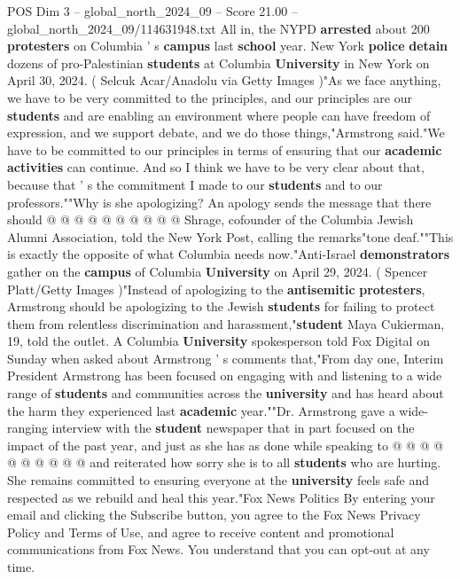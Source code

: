 \begin{textsample}{POS Dim 3 – global\_north\_2024\_09 – Score 21.00 – global\_north\_2024\_09/114631948.txt}
All in, the NYPD \textbf{arrested} about 200 \textbf{protesters} on Columbia ' s \textbf{campus} last \textbf{school} year.
New York \textbf{police} \textbf{detain} dozens of pro-Palestinian \textbf{students} at Columbia \textbf{University} in New York on April 30, 2024. ( Selcuk Acar/Anadolu via Getty Images )"As we face anything, we have to be very committed to the principles, and our principles are our \textbf{students} and are enabling an environment where people can have freedom of expression, and we support debate, and we do those things,"Armstrong said."We have to be committed to our principles in terms of ensuring that our \textbf{academic} \textbf{activities} can continue.
And so I think we have to be very clear about that, because that ' s the commitment I made to our \textbf{students} and to our professors.""Why is she apologizing?
An apology sends the message that there should @ @ @ @ @ @ @ @ @ @ Shrage, cofounder of the Columbia Jewish Alumni Association, told the New York Post, calling the remarks"tone deaf.""This is exactly the opposite of what Columbia needs now."Anti-Israel \textbf{demonstrators} gather on the \textbf{campus} of Columbia \textbf{University} on April 29, 2024. ( Spencer Platt/Getty Images )"Instead of apologizing to the \textbf{antisemitic} \textbf{protesters}, Armstrong should be apologizing to the Jewish \textbf{students} for failing to protect them from relentless discrimination and harassment,"\textbf{student} Maya Cukierman, 19, told the outlet.
A Columbia \textbf{University} spokesperson told Fox Digital on Sunday when asked about Armstrong ' s comments that,"From day one, Interim President Armstrong has been focused on engaging with and listening to a wide range of \textbf{students} and communities across the \textbf{university} and has heard about the harm they experienced last \textbf{academic} year.""Dr.
Armstrong gave a wide-ranging interview with the \textbf{student} newspaper that in part focused on the impact of the past year, and just as she has as done while speaking to @ @ @ @ @ @ @ @ @ @ and reiterated how sorry she is to all \textbf{students} who are hurting.
She remains committed to ensuring everyone at the \textbf{university} feels safe and respected as we rebuild and heal this year."Fox News Politics By entering your email and clicking the Subscribe button, you agree to the Fox News Privacy Policy and Terms of Use, and agree to receive content and promotional communications from Fox News.
You understand that you can opt-out at any time.

\end{textsample}
